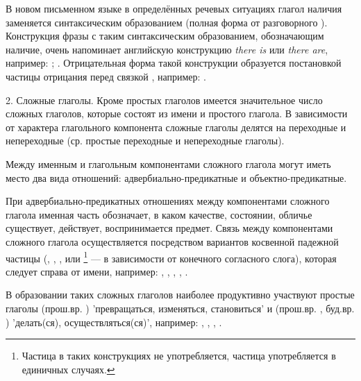 В новом письменном языке в определённых речевых ситуациях глагол наличия  заменяется синтаксическим образованием  (полная форма от разговорного ). Конструкция фразы с таким синтаксическим образованием, обозначающим наличие, очень напоминает английскую конструкцию \emph{there is} или \emph{there are}, например:
;
.
Отрицательная форма такой конструкции образуется постановкой частицы отрицания перед связкой , например:
.

2. Сложные глаголы. Кроме простых глаголов имеется значительное число сложных глаголов, которые состоят из имени и простого глагола. В зависимости от характера глагольного компонента сложные глаголы делятся на переходные и непереходные (ср. простые переходные и непереходные глаголы).

Между именным и глагольным компонентами сложного глагола могут иметь место два вида отношений: адвербиально-предикатные и объектно-предикатные.

При адвербиально-предикатных отношениях между компонентами сложного глагола именная часть обозначает, в каком качестве, состоянии, обличье существует, действует, воспринимается предмет. Связь между компонентами сложного глагола осуществляется посредством вариантов косвенной падежной частицы (, , ,  или \footnote[35]{Частица  в таких конструкциях не употребляется, частица  употребляется в единичных случаях.} --- в зависимости от конечного согласного слога), которая следует справа от имени, например:
,
,
,
,
.

В образовании таких сложных глаголов наиболее продуктивно участвуют простые глаголы	 (прош.вр. ) 'превращаться, изменяться, становиться' и (прош.вр. , буд.вр. ) 'делать(ся), осуществляться(ся)', например:
,
,
,
.

